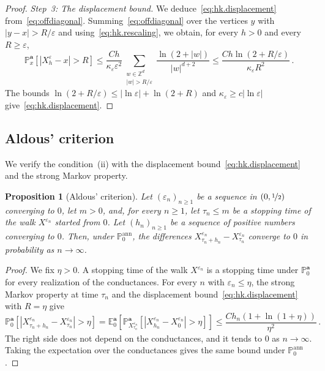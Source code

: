 \documentclass[11pt]{amsart}
\newtheorem{proposition}[theorem]{Proposition}
\numberwithin{equation}{section}
\newcommand{\Z}{\mathbb{Z}}
\newcommand{\E}{\mathbb{E}}
\newcommand{\PP}{\mathbb{P}}
\newcommand{\ba}{\mathbf{a}}
\newcommand{\eps}{\varepsilon}
\newcommand{\nf}{\nicefrac}
\begin{document}
\begin{proof}
\smallskip

\emph{Step~3: The displacement bound.}
We deduce~\eqref{eq:hk.displacement} from~\eqref{eq:offdiagonal}.
Summing~\eqref{eq:offdiagonal} over the vertices $y$ with $|y - x| > R/\eps$ and using~\eqref{eq:hk.rescaling}, we obtain, for every $h > 0$ and every $R \geq \eps$,
\begin{equation*}
    \PP^\ba_x \left[ |X^\eps_h - x| > R \right] \leq \frac{C h}{\kappa_\eps \eps^2} \sum_{\substack{w \in \Z^d \\ |w| > R/\eps}} \frac{\ln(2 + |w|)}{|w|^{d+2}} \leq \frac{C h \ln(2 + R/\eps)}{\kappa_\eps R^2}\,.
\end{equation*}
The bounds $\ln(2 + R/\eps) \leq |\ln \eps| + \ln(2 + R)$ and $\kappa_\eps \geq c |\ln \eps|$ give~\eqref{eq:hk.displacement}.
\end{proof}

\subsection{Aldous' criterion} \label{sec:tightness}

We verify the condition~(ii) with the displacement bound~\eqref{eq:hk.displacement} and the strong Markov property.

\begin{proposition}[Aldous' criterion] \label{prop:aldous}
Let $(\eps_n)_{n \geq 1}$ be a sequence in $(0, \nf12)$ converging to $0$, let $m > 0$, and, for every $n \geq 1$, let $\tau_n \leq m$ be a stopping time of the walk $X^{\eps_n}$ started from $0$.
Let $(h_n)_{n \geq 1}$ be a sequence of positive numbers converging to $0$.
Then, under $\PP^{\mathrm{ann}}_0$, the differences $X^{\eps_n}_{\tau_n + h_n} - X^{\eps_n}_{\tau_n}$ converge to $0$ in probability as $n \to \infty$.
\end{proposition}

\begin{proof}
We fix $\eta > 0$.
A stopping time of the walk $X^{\eps_n}$ is a stopping time under $\PP^\ba_0$ for every realization of the conductances.
For every $n$ with $\eps_n \leq \eta$, the strong Markov property at time $\tau_n$ and the displacement bound~\eqref{eq:hk.displacement} with $R = \eta$ give
\begin{equation*}
    \PP^\ba_0 \left[ |X^{\eps_n}_{\tau_n + h_n} - X^{\eps_n}_{\tau_n}| > \eta \right] = \E^\ba_0 \left[ \PP^\ba_{X^{\eps_n}_{\tau_n}} \left[ |X^{\eps_n}_{h_n} - X^{\eps_n}_0| > \eta \right] \right] \leq \frac{C h_n (1 + \ln(1 + \eta))}{\eta^2}\,.
\end{equation*}
The right side does not depend on the conductances, and it tends to $0$ as $n \to \infty$.
Taking the expectation over the conductances gives the same bound under $\PP^{\mathrm{ann}}_0$.
\end{proof}
\end{document}

